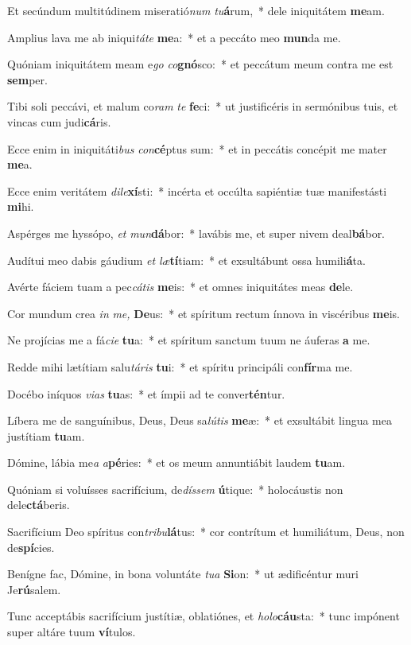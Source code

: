 \item Et secúndum multitúdinem miseratió\textit{num} \textit{tu}\textbf{á}rum,~* dele iniquitátem \textbf{me}am.
\item Amplius lava me ab iniqui\textit{táte} \textbf{me}a:~* et a peccáto meo \textbf{mun}da me.
\item Quóniam iniquitátem meam e\textit{go} \textit{co}\textbf{gnó}sco:~* et peccátum meum contra me est \textbf{sem}per.
\item Tibi soli peccávi, et malum co\textit{ram} \textit{te} \textbf{fe}ci:~* ut justificéris in sermónibus tuis, et vincas cum judi\textbf{cá}ris.
\item Ecce enim in iniquitáti\textit{bus} \textit{con}\textbf{cé}ptus sum:~* et in peccátis concépit me mater \textbf{me}a.
\item Ecce enim veritátem \textit{dile}\textbf{xí}sti:~* incérta et occúlta sapiéntiæ tuæ manifestásti \textbf{mi}hi.
\item Aspérges me hyssópo, \textit{et} \textit{mun}\textbf{dá}bor:~* lavábis me, et super nivem deal\textbf{bá}bor.
\item Audítui meo dabis gáudium \textit{et} \textit{læ}\textbf{tí}tiam:~* et exsultábunt ossa humili\textbf{á}ta.
\item Avérte fáciem tuam a pec\textit{cátis} \textbf{me}is:~* et omnes iniquitátes meas \textbf{de}le.
\item Cor mundum crea \textit{in} \textit{me,} \textbf{De}us:~* et spíritum rectum ínnova in viscéribus \textbf{me}is.
\item Ne projícias me a fá\hspace{0.01em}\textit{cie} \textbf{tu}a:~* et spíritum sanctum tuum ne áuferas \textbf{a} me.
\item Redde mihi lætítiam salu\textit{táris} \textbf{tu}i:~* et spíritu principáli con\textbf{fír}ma me.
\item Docébo iníquos \textit{vias} \textbf{tu}as:~* et ímpii ad te conver\textbf{tén}tur.
\item Líbera me de sanguínibus, Deus, Deus sa\hspace{0.02em}\textit{lútis} \textbf{me}æ:~* et exsultábit lingua mea justítiam \textbf{tu}am.
\item Dómine, lábia me\textit{a} \textit{a}\textbf{pé}ries:~* et os meum annuntiábit laudem \textbf{tu}am.
\item Quóniam si voluísses sacrifícium, de\hspace{0.02em}\textit{díssem} \textbf{ú}tique:~* holocáustis non dele\textbf{ctá}beris.
\item Sacrifícium Deo spíritus con\textit{tribu}\textbf{lá}tus:~* cor contrítum et humiliátum, Deus, non de\textbf{spí}cies.
\item Benígne fac, Dómine, in bona voluntáte \textit{tua} \textbf{Si}on:~* ut ædificéntur muri Je\textbf{rú}salem.
\item Tunc acceptábis sacrifícium justítiæ, oblatiónes, et \textit{holo}\textbf{cáu}sta:~* tunc impónent super altáre tuum \textbf{ví}tulos.
